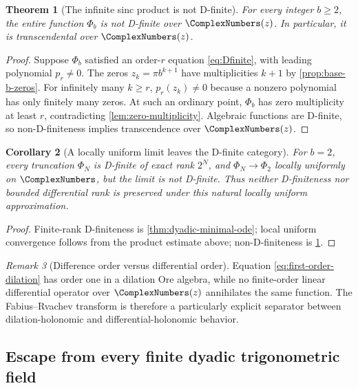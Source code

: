 \documentclass[11pt]{article}
\numberwithin{equation}{section}
\newtheorem{theorem}{Theorem}[section]
\newtheorem{corollary}[theorem]{Corollary}
\theoremstyle{definition}
\theoremstyle{remark}
\newtheorem{remark}[theorem]{Remark}
\begin{document}
\begin{theorem}[The infinite sinc product is not D-finite]
\label{thm:Phi-not-Dfinite}
For every integer $b\ge2$, the entire function $\Phi_b$ is not D-finite over
$\ComplexNumbers(z)$.  In particular, it is transcendental over $\ComplexNumbers(z)$.
\end{theorem}
\begin{proof}
Suppose $\Phi_b$ satisfied an order-$r$ equation
\eqref{eq:Dfinite}, with leading polynomial $p_r\ne0$.  The zeros
$z_k=\pi b^{k+1}$ have multiplicities $k+1$ by
\cref{prop:base-b-zeros}.  For infinitely many $k\ge r$, $p_r(z_k)\ne0$
because a nonzero polynomial has only finitely many zeros.  At such an ordinary
point, $\Phi_b$ has zero multiplicity at least $r$, contradicting
\cref{lem:zero-multiplicity}.  Algebraic functions are D-finite, so
non-D-finiteness implies transcendence over $\ComplexNumbers(z)$.
\end{proof}

\begin{corollary}[A locally uniform limit leaves the D-finite category]
\label{cor:Dfinite-limit-failure}
For $b=2$, every truncation $\Phi_N$ is D-finite of exact rank $2^N$, and
$\Phi_N\to\Phi_2$ locally uniformly on $\ComplexNumbers$, but the limit is not D-finite.
Thus neither D-finiteness nor bounded differential rank is preserved under this
natural locally uniform approximation.
\end{corollary}
\begin{proof}
Finite-rank D-finiteness is \cref{thm:dyadic-minimal-ode}; local uniform
convergence follows from the product estimate above; non-D-finiteness is
\cref{thm:Phi-not-Dfinite}.
\end{proof}

\begin{remark}[Difference order versus differential order]
Equation \eqref{eq:first-order-dilation} has order one in a dilation Ore
algebra, while no finite-order linear differential operator over $\ComplexNumbers(z)$
annihilates the same function.  The Fabius--Rvachev transform is therefore a
particularly explicit separator between dilation-holonomic and
differential-holonomic behavior.
\end{remark}

\subsection{Escape from every finite dyadic trigonometric field}
\end{document}
